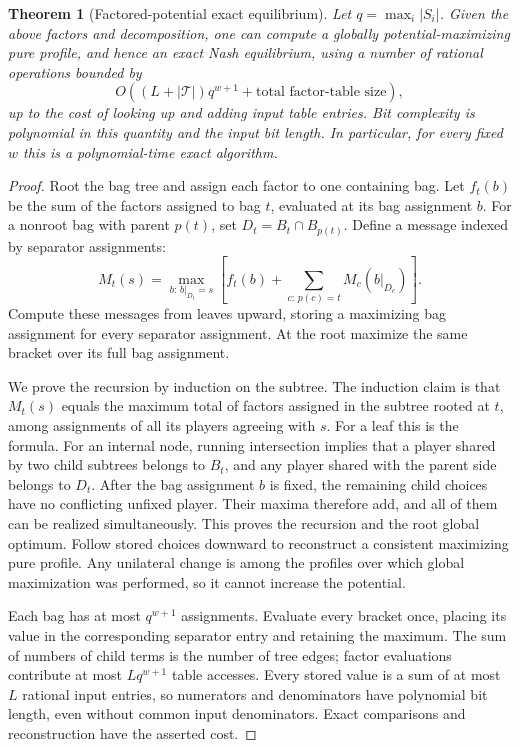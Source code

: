 \documentclass[11pt]{article}
\newtheorem{theorem}{Theorem}
\theoremstyle{definition}
\begin{document}
\begin{theorem}[Factored-potential exact equilibrium]\label{tree}
Let $q=\max_i|S_i|$. Given the above factors and decomposition, one can
compute a globally potential-maximizing pure profile, and hence an exact
Nash equilibrium, using a number of rational operations bounded by
\[
 O\!\left((L+|\mathcal T|)q^{w+1}
          +\text{total factor-table size}\right),
\]
up to the cost of looking up and adding input table entries. Bit complexity
is polynomial in this quantity and the input bit length. In particular,
for every fixed $w$ this is a polynomial-time exact algorithm.
\end{theorem}
\begin{proof}
Root the bag tree and assign each factor to one containing bag. Let
$f_t(b)$ be the sum of the factors assigned to bag $t$, evaluated at its
bag assignment $b$. For a nonroot bag with parent $p(t)$, set
$D_t=B_t\cap B_{p(t)}$. Define a message indexed by separator assignments:
\[
 M_t(s)=\max_{b:\,b|_{D_t}=s}
 \left[f_t(b)+\sum_{c:\,p(c)=t}M_c(b|_{D_c})\right].
\]
Compute these messages from leaves upward, storing a maximizing bag
assignment for every separator assignment. At the root maximize the same
bracket over its full bag assignment.

We prove the recursion by induction on the subtree. The induction claim
is that $M_t(s)$ equals the maximum total of factors assigned in the
subtree rooted at $t$, among assignments of all its players agreeing with
$s$. For a leaf this is the formula. For an internal node, running
intersection implies that a player shared by two child subtrees belongs
to $B_t$, and any player shared with the parent side belongs to $D_t$.
After the bag assignment $b$ is fixed, the remaining child choices have
no conflicting unfixed player. Their maxima therefore add, and all of
them can be realized simultaneously. This proves the recursion and the
root global optimum. Follow stored choices downward to reconstruct a
consistent maximizing pure profile. Any unilateral change is among the
profiles over which global maximization was performed, so it cannot
increase the potential.

Each bag has at most $q^{w+1}$ assignments. Evaluate every bracket once,
placing its value in the corresponding separator entry and retaining the
maximum. The sum of numbers of child terms is the number of tree edges;
factor evaluations contribute at most $Lq^{w+1}$ table accesses. Every
stored value is a sum of at most $L$ rational input entries, so numerators
and denominators have polynomial bit length, even without common input
denominators. Exact comparisons and reconstruction have the asserted cost.
\end{proof}
\end{document}
